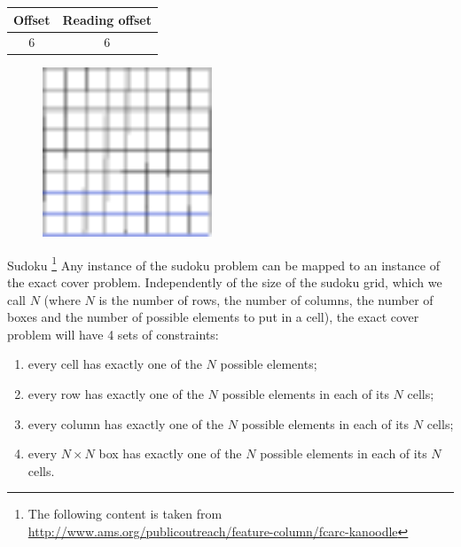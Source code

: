 \documentclass{beamer}
\begin{document}
\begin{frame}{}
    \begin{table}
        \centering
        \begin{tabular}{|c|c|}
            \hline
            Offset & Reading offset \\
            \hline
            6 & 6 \\
            \hline
        \end{tabular}
    \end{table}
    \begin{figure}
        \centering
        \includegraphics[width=0.45\textwidth]{grid_3r_3_ro_3.pdf}
        \label{fig:grid_3r_3_ro_3}
    \end{figure}
\end{frame}


\begin{frame}{Sudoku \footnote[frame]{The following content is 
    taken from \url{http://www.ams.org/publicoutreach/feature-column/fcarc-kanoodle}}}
    Any instance of the sudoku problem can be mapped to an instance of the exact cover problem.
    Independently of the size of the sudoku grid, which we call $N$ (where $N$ is the number
    of rows, the number of columns, the number of boxes and the number of possible
    elements to put in a cell), the exact cover problem will have 4 sets of constraints:
    \begin{enumerate}
        \item every cell has exactly one of the $N$ possible elements;
        \item every row has exactly one of the $N$ possible elements in each of its $N$ cells;
        \item every column has exactly one of the $N$ possible elements in each of its $N$ cells;
        \item every $N\times N$ box has exactly one of the $N$ possible elements in each of its $N$ cells.
    \end{enumerate}
\end{frame}
\end{document}
